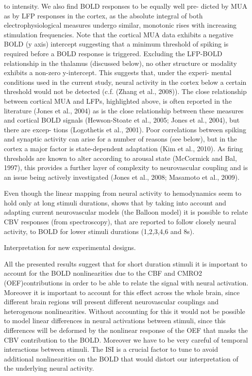 to intensity. We also find BOLD responses to be equally well pre-
dicted by MUA as by LFP responses in the cortex, as the absolute
integral of both electrophysiological measures undergo similar,
monotonic rises with increasing stimulation frequencies. Note that
the cortical MUA data exhibits a negative BOLD (y axis) intercept
suggesting that a minimum threshold of spiking is required before
a BOLD response is triggered. Excluding the LFP-BOLD relationship
in the thalamus (discussed below), no other structure or modality
exhibits a non-zero y-intercept. This suggests that, under the experi-
mental conditions used in the current study, neural activity in the
cortex below a certain threshold would not be detected (c.f. (Zhang
et al., 2008)).
The close relationship between cortical MUA and LFPs, highlighted
above, is often reported in the literature (Jones et al., 2004) as is the
close relationship between these measures and cortical BOLD signals
(Hewson-Stoate et al., 2005; Jones et al., 2004), but there are excep-
tions (Logothetis et al., 2001). Poor correlations between spiking
and synaptic activity can arise for a number of reasons (see below),
but in the cortex a major factor is state-dependent adaptation (Kim
et al., 2010). As firing thresholds are known to alter according to
arousal state (McCormick and Bal, 1997), this provides a further
layer of complexity to neurovascular coupling and is an issue being
actively investigated (Jones et al., 2008; Masamoto et al., 2009).

Even though the linear mapping from neural activity to hemodynamics seem to hold only at long stimuli durations, \citep{tang_nonlinear_2009} shows that by taking into account and adapting current neurovascular models (the Balloon model) it is possible to relate CBV responses (from spectroscopy), that are reported to follow closely neural activity, to BOLD for lower stimuli durations (1,2,3,4,6 and 8s).


 Interpretation for new experimental designs.

All the presented results suggest that for short duration stimuli it is important to account for the BOLD nonlinearities due to the CBF and CMRO2 (OEF)contributions in order to be able to relate the signal with neural activation. Moreover it is important to account for this effect across the whole brain, since different brain regions will present different neurovascular couplings and heterogenous nonlinearities. Without accounting for this it would not be possible to model linear differences in neural activations between stimuli, since this differences will be deformed by the nonlinear response of the OEF that masks the CBV contribution to the BOLD. Moreover we have to be very careful of temporal interactions between stimuli. The ISI is a crucial factor to tune to avoid additional nonlinearities on the BOLD that would distort our interpretation of the underlying neural activity.

